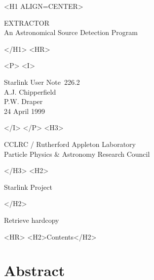 \documentclass[twoside,11pt]{article}
\newcommand{\stardoccategory}  {Starlink User Note}
\newcommand{\stardocsource}    {sun\stardocnumber}
\newcommand{\stardocnumber}    {226.2}
\newcommand{\stardocauthors}   {A.J. Chipperfield\\
                                P.W. Draper}
\newcommand{\stardocdate}      {24 April 1999}
\newcommand{\stardoctitle}     {EXTRACTOR\\
                                An Astronomical Source Detection Program}
\newcommand{\htmladdnormallink}[2]{#1}
\newcommand{\htmladdimg}[1]{}
\newcommand{\htmlref}[2]{#1}
\newcommand{\htmladdtonavigation}[1]{}
\newcommand{\xlabel}[1]{}
\renewcommand{\_}{\texttt{\symbol{95}}}
\begin{document}
\begin{htmlonly}
   \xlabel{}
   \begin{rawhtml} <H1 ALIGN=CENTER> \end{rawhtml}
      \stardoctitle
   \begin{rawhtml} </H1> <HR> \end{rawhtml}

   \begin{center}
     \htmladdimg{sun226fig.gif}
   \end{center}

   \begin{rawhtml} <P> <I> \end{rawhtml}
   \stardoccategory\ \stardocnumber \\
   \stardocauthors \\
   \stardocdate
   \begin{rawhtml} </I> </P> <H3> \end{rawhtml}
      \htmladdnormallink{CCLRC}{http://www.cclrc.ac.uk} /
      \htmladdnormallink{Rutherford Appleton Laboratory}
                        {http://www.cclrc.ac.uk/ral} \\
      \htmladdnormallink{Particle Physics \& Astronomy Research Council}
                        {http://www.pparc.ac.uk} \\
   \begin{rawhtml} </H3> <H2> \end{rawhtml}
      \htmladdnormallink{Starlink Project}{http://star-www.rl.ac.uk/}
   \begin{rawhtml} </H2> \end{rawhtml}
   \htmladdnormallink{\htmladdimg{source.gif} Retrieve hardcopy}
      {http://star-www.rl.ac.uk/cgi-bin/hcserver?\stardocsource}\\

  \label{stardoccontents}
  \begin{rawhtml}
    <HR>
    <H2>Contents</H2>
  \end{rawhtml}
  \htmladdtonavigation{\htmlref{\htmladdimg{contents_motif.gif}}
        {stardoccontents}}

  \section{\xlabel{abstract}Abstract}
\end{htmlonly}
\end{document}
